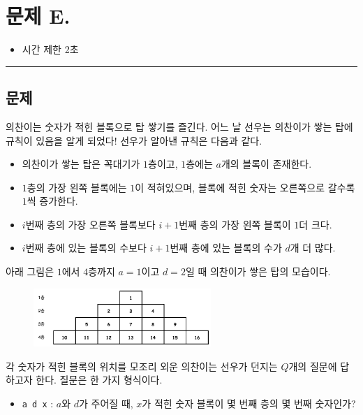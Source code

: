 \newpage
\section*{{\Large 문제 E.} }

\begin{itemize}
    \item 시간 제한 \tabto{2cm} 2초
\end{itemize}

\hrule

\subsection*{문제}

의찬이는 숫자가 적힌 블록으로 탑 쌓기를 즐긴다. 어느 날 선우는 의찬이가 쌓는 탑에 규칙이 있음을 알게 되었다! 선우가 알아낸 규칙은 다음과 같다.

\begin{itemize}
    \item 의찬이가 쌓는 탑은 꼭대기가 $1$층이고, $1$층에는 $a$개의 블록이 존재한다.
    \item $1$층의 가장 왼쪽 블록에는 $1$이 적혀있으며, 블록에 적힌 숫자는 오른쪽으로 갈수록 $1$씩 증가한다.
    \item $i$번째 층의 가장 오른쪽 블록보다 $i+1$번째 층의 가장 왼쪽 블록이 $1$더 크다.
    \item $i$번째 층에 있는 블록의 수보다 $i+1$번째 층에 있는 블록의 수가 $d$개 더 많다.
\end{itemize}

아래 그림은 $1$에서 $4$층까지 $a=1$이고 $d=2$일 때 의찬이가 쌓은 탑의 모습이다.

\begin{figure}[h]
    \centering
    \includegraphics[width=0.6\textwidth]{problems/image/sootab.png}
\end{figure}

각 숫자가 적힌 블록의 위치를 모조리 외운 의찬이는 선우가 던지는 $Q$개의 질문에 답하고자 한다. 질문은 한 가지 형식이다.

\begin{itemize}
    \item \texttt{\color{red}a d x} : $a$와 $d$가 주어질 때, $x$가 적힌 숫자 블록이 몇 번째 층의 몇 번째 숫자인가?
\end{itemize}

